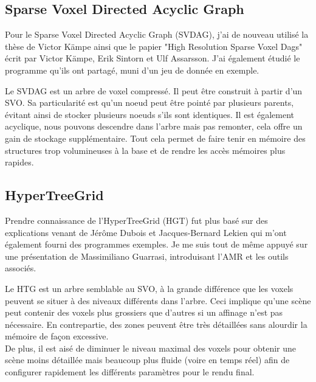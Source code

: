 \documentclass[12pt,a4paper,twoside]{article}
\begin{document}
    \subsection{Sparse Voxel Directed Acyclic Graph}

    Pour le Sparse Voxel Directed Acyclic Graph (SVDAG), j'ai de nouveau utilisé la thèse de Victor Kämpe\cite{kampethesis2016} ainsi que le papier
    "High Resolution Sparse Voxel Dags"\cite{kampe2013sg} écrit par Victor Kämpe, Erik Sintorn et Ulf Assarsson. J'ai également étudié le
    programme qu'ils ont partagé, muni d'un jeu de donnée en exemple.

    Le SVDAG est un arbre de voxel compressé. Il peut être construit à partir d'un SVO.
    Sa particularité est qu'un noeud peut être pointé par plusieurs parents, évitant ainsi de stocker plusieurs noeuds s'ils sont identiques.
    Il est également acyclique, nous pouvons descendre dans l'arbre mais pas remonter, cela offre un gain de stockage supplémentaire.
    Tout cela permet de faire tenir en mémoire des structures trop volumineuses à la base et de rendre les accès mémoires plus rapides.

    \begin{figure}[H]
    \end{figure}

    \begin{figure}[H]
    \end{figure}
    \newpage
    \subsection{HyperTreeGrid}

    Prendre connaissance de l'HyperTreeGrid (HGT) fut plus basé sur des explications venant de
    Jérôme Dubois et Jacques-Bernard Lekien qui m'ont également fourni des programmes exemples. Je me suis tout de même
    appuyé sur une présentation de Massimiliano Guarrasi\cite{amr2015}, introduisant l'AMR et les outils associés.

    Le HTG est un arbre semblable au SVO, à la grande différence que les voxels peuvent se situer à des niveaux différents dans l'arbre.
    Ceci implique qu'une scène peut contenir des voxels plus grossiers que d'autres si un affinage n'est pas nécessaire.
    En contrepartie, des zones peuvent être très détaillées sans alourdir la mémoire de façon excessive. \\
    De plus, il est aisé de diminuer le niveau maximal des voxels pour obtenir une scène moins détaillée
    mais beaucoup plus fluide (voire en temps réel) afin de configurer rapidement les différents paramètres pour le rendu final.
\end{document}

